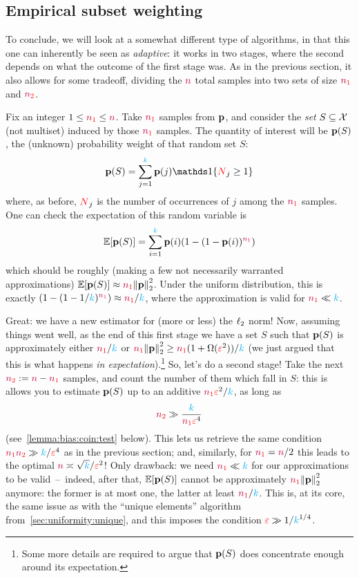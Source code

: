 \subsection{Empirical subset weighting} 
To conclude, we will look at a somewhat different type of algorithms, in that this one can inherently be seen as \emph{adaptive}: it works in two stages, where the second depends on what the outcome of the first stage was. As in the previous section, it also allows for some tradeoff, dividing the $\ns$ total samples into two sets of size $\nss$ and $\nst$.


Fix an integer $1\leq \nss \leq \ns$. Take $\nss$ \iid samples from $\p$, and consider the \emph{set} $S\subseteq\domain$ (not multiset) induced by those $\nss$ samples. The quantity of interest will be $\p(S)$, the (unknown) probability weight of that random set $S$:
\begin{equation}
    \p(S) = \sum_{j=1}^\ab \p(j) \indic{\occur_j \geq 1}
\end{equation}
where, as before, $\occur_j$ is the number of occurrences of $j$ among the $\nss$ samples. One can check the expectation of this random variable is
\begin{equation}
  \label{eq:expect:empirical:weight}
    \expect{\p(S)} = \sum_{i=1}^\ab \p(i) (1-(1-\p(i))^{\nss})
\end{equation}
which should be roughly (making a few not necessarily warranted approximations) $\expect{\p(S)}\approx \nss\normtwo{\p}^2$. Under the uniform distribution, this is exactly $(1-(1-1/\ab)^{\nss})\approx \nss/\ab$, where the approximation is valid for $\nss\ll \ab$.

Great: we have a new estimator for (more or less) the $\lp[2]$ norm! Now, assuming things went well, as the end of this first stage we have a set $S$ such that $\p(S)$ is approximately either $\nss/\ab$ or $\nss\normtwo{\p}^2\geq \nss(1+\Omega(\dst^2))/\ab$ (we just argued that this is what happens \emph{in expectation}).\footnote{Some more details are required to argue that $\p(S)$ does concentrate enough around its expectation.} So, let's do a second stage! Take the next $\nst \eqdef \ns-\nss$ samples, and count the number of them which fall in $S$: this is allows you to estimate $\p(S)$  up to an additive $\nss\dst^2/\ab$, as long as
\[
      \nst \gg \frac{\ab}{\nss\dst^4}
\]
(see~\cref{lemma:bias:coin:test} below). This lets us retrieve the same condition $\nss\nst\gg \ab/\dst^4$ as in the previous section; and, similarly, for $\nss=\ns/2$ this leads to the optimal $\ns \asymp \sqrt{\ab}/\dst^2$! Only drawback: we need $\nss\ll \ab$ for our approximations to be valid~--~indeed, after that, $\expect{\p(S)}$ cannot be approximately $\nss\normtwo{\p}^2$ anymore: the former is at most one, the latter at least $\nss/\ab$. This is, at its core, the same issue as with the ``unique elements'' algorithm from~\cref{sec:uniformity:unique}, and this imposes the condition $\dst \gg 1/\ab^{1/4}$.

